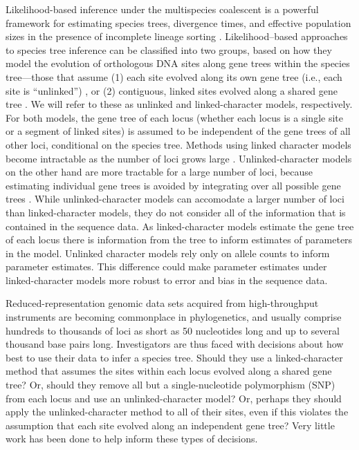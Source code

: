 Likelihood-based inference under the multispecies coalescent is a powerful 
framework for estimating species trees,  divergence times, and  effective 
population sizes in the presence of incomplete lineage sorting 
\citep{xuChallengesSpeciesTree2016}. Likelihood--based approaches to species 
tree inference can be classified into two groups, based on how they model the 
evolution of orthologous DNA sites along gene trees within the species 
tree---those that assume (1) each site evolved along its own gene tree 
(i.e., each site is ``unlinked'') 
\citep{bryantInferringSpeciesTrees2012, maioPoMoAlleleFrequencyBased2015}, 
or (2) contiguous, linked sites evolved along a shared gene tree 
\citep{liuSpeciesTreesGene2007, ogilvieStarBEAST2BringsFaster2017, 
yangBPPProgramSpecies2015}. We will refer to these as unlinked and 
linked-character models, respectively. For both models, the gene tree of each 
locus (whether each locus is a single site or a segment of linked sites) 
is assumed to be independent of the gene 
trees of all other loci, conditional on the species tree. Methods using linked 
character models become intractable as the number of loci grows large 
\citep{bryantInferringSpeciesTrees2012}. Unlinked-character models on the other 
hand are more tractable for a large number of loci, because  estimating 
individual gene trees is avoided by integrating over all possible gene trees 
\citep{bryantInferringSpeciesTrees2012}. While unlinked-character models can 
accomodate a larger number of loci than linked-character models, they do not 
consider all of the information that is contained in the sequence data. As 
linked-character models estimate the gene tree of each locus there is 
information from the tree to inform estimates of parameters in the model. 
Unlinked character models rely only on allele counts to inform parameter 
estimates. This difference could make parameter estimates under linked-character 
models more robust to error and bias in the sequence data.

Reduced-representation genomic data sets acquired from high-throughput instruments
are becoming commonplace in phylogenetics, and usually comprise hundreds to 
thousands of loci as short as 50 nucleotides long and up to several thousand 
base pairs long. Investigators are thus faced with decisions about how best to 
use their data to infer a species tree. Should they use a linked-character 
method that assumes the sites within each locus evolved along a shared gene 
tree? Or, should they remove all but a single-nucleotide polymorphism (SNP) from 
each locus and use an unlinked-character model? Or, perhaps they should apply 
the unlinked-character method to all of their sites, even if this violates the 
assumption that each site evolved along an independent gene tree? Very little 
work has been done to help inform these types of decisions. 

